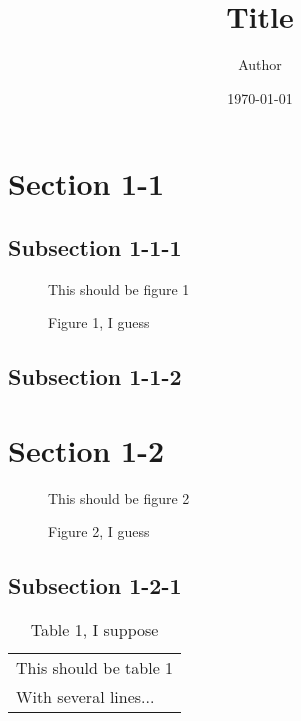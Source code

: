 \documentclass[10pt]{article}
\title{Title}
\author{Author}
\date{\today}
\begin{document}
\maketitle

\dosecttoc
\dosectlot
\dosectlof

\faketableofcontents
\fakelistoftables
\fakelistoffigures


\section{Section 1-1}
\label{sec:section-1-1}
\secttoc
\sectlot
\sectlof


\subsection{Subsection 1-1-1}
\label{sec:subsection-1-1-1}

\begin{figure}
  \centering
  This should be figure 1
  \caption{Figure 1, I guess}
  \label{fig:figure-1}
\end{figure}


\subsection{Subsection 1-1-2}
\label{sec:subsection-1-1-2}

\section{Section 1-2}
\label{sec:section-1-2}
\secttoc
\sectlot
\sectlof

\begin{figure}
  \centering
  This should be figure 2
  \caption{Figure 2, I guess}
  \label{fig:figure-2}
\end{figure}

\subsection{Subsection 1-2-1}
\label{sec:subsection-1-2-1}

\begin{table}
  \centering
  \begin{tabular}{l}
    This should be table 1\\
    With several lines...
  \end{tabular}
  \caption{Table 1, I suppose}
  \label{tab:table-1}
\end{table}
\end{document}
